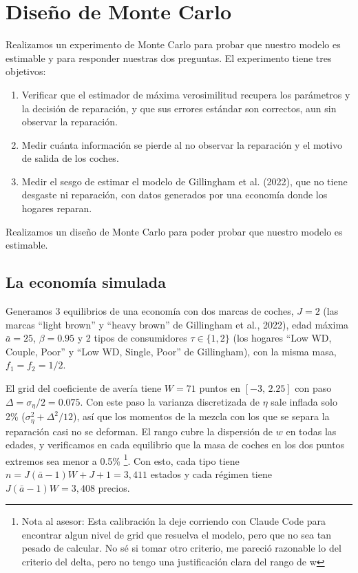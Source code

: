 \documentclass{article}
\begin{document}
\section{Diseño de Monte Carlo}

Realizamos un experimento de Monte Carlo para probar que nuestro modelo es estimable y para responder nuestras dos preguntas. El experimento tiene tres objetivos:
\begin{enumerate}
    \item Verificar que el estimador de máxima verosimilitud recupera los parámetros y la decisión de reparación, y que sus errores estándar son correctos, aun sin observar la reparación.
    \item Medir cuánta información se pierde al no observar la reparación y el motivo de salida de los coches.
    \item Medir el sesgo de estimar el modelo de Gillingham et al. (2022), que no tiene desgaste ni reparación, con datos generados por una economía donde los hogares reparan.
\end{enumerate}
Realizamos un diseño de Monte Carlo para poder probar que nuestro modelo es estimable. 

\subsection{La economía simulada}\label{sec:calibracion}

Generamos 3 equilibrios de una economía con dos marcas de coches, $J=2$ (las marcas ``light brown'' y ``heavy brown'' de Gillingham et al., 2022), edad máxima $\bar{a}=25$, $\beta=0.95$ y 2 tipos de consumidores $\tau \in\{1,2\}$ (los hogares ``Low WD, Couple, Poor'' y ``Low WD, Single, Poor'' de Gillingham), con la misma masa, $f_1=f_2=1/2$.

El grid del coeficiente de avería tiene $W=71$ puntos en $[-3,\,2.25]$ con paso $\Delta=\sigma_\eta/2=0.075$. Con este paso la varianza discretizada de $\eta$ sale inflada solo 2\% ($\sigma_\eta^2+\Delta^2/12$), así que los momentos de la mezcla con los que se separa la reparación casi no se deforman. El rango cubre la dispersión de $w$ en todas las edades, y verificamos en cada equilibrio que la masa de coches en los dos puntos extremos sea menor a 0.5\% \footnote{Nota al asesor: Esta calibración la deje corriendo con Claude Code para encontrar algun nivel de grid que resuelva el modelo, pero que no sea tan pesado de calcular. No sé si tomar otro criterio, me pareció razonable lo del criterio del delta, pero no tengo una justificación clara del rango de w}. Con esto, cada tipo tiene $n=J(\bar{a}-1)W+J+1=3{,}411$ estados y cada régimen tiene $J(\bar{a}-1)W=3{,}408$ precios.
\end{document}
